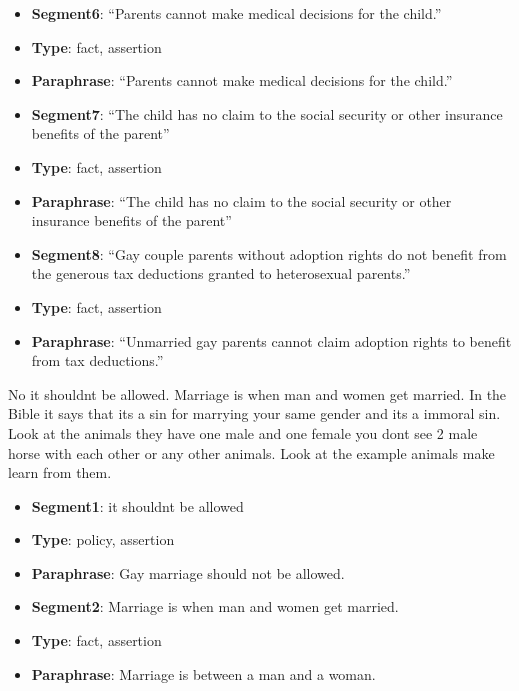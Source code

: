 \begin{itemize}[topsep=0.3cm]
\item[] \textbf{Segment6}: ``Parents cannot make medical decisions for the child.''
\item[] \textbf{Type}: fact, assertion
\item[] \textbf{Paraphrase}: ``Parents cannot make medical decisions for the child.''
\end{itemize}

\begin{itemize}[topsep=0.3cm]
\item[] \textbf{Segment7}: ``The child has no claim to the social security or
other insurance benefits of the parent''
\item[] \textbf{Type}: fact, assertion
\item[] \textbf{Paraphrase}: ``The child has no claim to the social security or
other insurance benefits of the parent''
\end{itemize}

\begin{itemize}[topsep=0.3cm]
\item[] \textbf{Segment8}: ``Gay couple parents without adoption rights do not
benefit from the generous tax deductions granted to heterosexual parents.''
\item[] \textbf{Type}: fact, assertion
\item[] \textbf{Paraphrase}: ``Unmarried gay parents cannot claim adoption rights
to benefit from tax deductions.''
\end{itemize}

\begin{mydef}
No it shouldnt be allowed. Marriage is when man and women get married. In the
Bible it says that its a sin for marrying your same gender and its a immoral
sin. Look at the animals they have one male and one female you dont see 2 male
horse with each other or any other animals. Look at the example animals make
learn from them.
\end{mydef}

\begin{itemize}[topsep=0.3cm]
\item[] \textbf{Segment1}: it shouldnt be allowed
\item[] \textbf{Type}: policy, assertion
\item[] \textbf{Paraphrase}: Gay marriage should not be allowed.
\end{itemize}

\begin{itemize}[topsep=0.3cm]
\item[] \textbf{Segment2}: Marriage is when man and women get married.
\item[] \textbf{Type}: fact, assertion
\item[] \textbf{Paraphrase}: Marriage is between a man and a woman.
\end{itemize}


